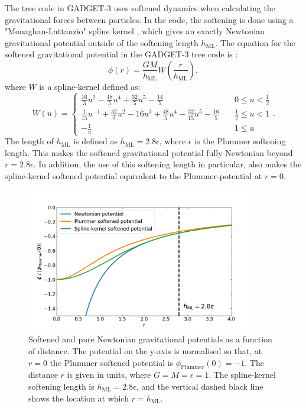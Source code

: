 \documentclass[english, twoside]{HYgradu}
\begin{document}
The tree code in GADGET-3 uses softened dynamics when calculating the gravitational forces between particles. In the code, the softening is done using a "Monaghan-Lattanzio" spline kernel \citep{Monaghan1985}, which gives an exactly Newtonian gravitational potential outside of the softening length $h_\mathrm{ML}$. The equation for the softened gravitational potential in the GADGET-3 tree code is \citep{Springel2001}:
\begin{equation}
\phi(r) = \frac{GM}{h_\mathrm{ML}} W \left(\frac{r}{h_\mathrm{ML}} \right), \label{eq:splinekernel_softened_potential}
\end{equation}
where $W$ is a spline-kernel defined as:
\begin{equation}
W(u) = 
\begin{cases}
\frac{16}{3}u^2 - \frac{48}{5} u^4 + \frac{32}{5} u^5 - \frac{14}{5} &\quad 0 \leq u < \frac{1}{2} \\
\frac{1}{15}u^{-1} + \frac{32}{3}u^2 - 16u^3 + \frac{48}{5} u^4 - \frac{32}{15} u^5 - \frac{16}{5} &\quad \frac{1}{2} \leq u < 1 \\
-\frac{1}{u} &\quad  1 \leq u
\end{cases}.
\end{equation} 
The length of $h_\mathrm{ML}$ is defined as $h_\mathrm{ML} = 2.8\epsilon$, where $\epsilon$ is the Plummer softening length. This makes the softened gravitational potential fully Newtonian beyond $r = 2.8 \epsilon$. In addition, the use of this softening length in particular, also makes the spline-kernel softened potential equivalent to the Plummer-potential at $r = 0$.

\begin{figure}
	\centering	
	\includegraphics[width=0.9\textwidth]{softened_potentials.png}	
	\caption{Softened and pure Newtonian gravitational potentials as a function of distance. The potential on the y-axis is normalised so that, at $r=0$ the Plummer softened potential is $\phi_\mathrm{Plummer}(0) = -1$. The distance $r$ is given in units, where $G = M = \epsilon = 1$. The spline-kernel softening length is $h_\mathrm{ML} = 2.8 \epsilon$, and the vertical dashed black line shows the location at which $r = h_\mathrm{ML}$.}
	\label{figure:softened_potentials}
\end{figure}
\end{document}
